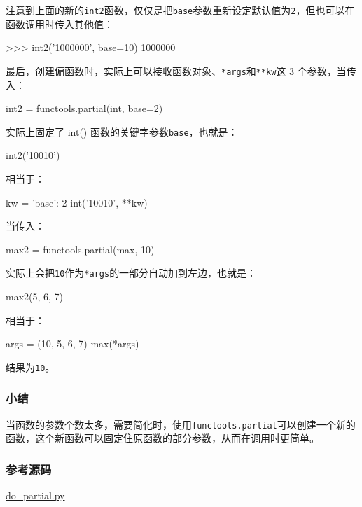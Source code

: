 注意到上面的新的\texttt{int2}函数，仅仅是把\texttt{base}参数重新设定默认值为\texttt{2}，但也可以在函数调用时传入其他值：

\begin{pythoncode}
>>> int2('1000000', base=10)
1000000
\end{pythoncode}

最后，创建偏函数时，实际上可以接收函数对象、\texttt{*args}和\texttt{**kw}这
3 个参数，当传入：

\begin{pythoncode}
int2 = functools.partial(int, base=2)
\end{pythoncode}

实际上固定了 int() 函数的关键字参数\texttt{base}，也就是：

\begin{pythoncode}
int2('10010')
\end{pythoncode}

相当于：

\begin{pythoncode}
kw = { 'base': 2 }
int('10010', **kw)
\end{pythoncode}

当传入：

\begin{pythoncode}
max2 = functools.partial(max, 10)
\end{pythoncode}

实际上会把\texttt{10}作为\texttt{*args}的一部分自动加到左边，也就是：

\begin{pythoncode}
max2(5, 6, 7)
\end{pythoncode}

相当于：

\begin{pythoncode}
args = (10, 5, 6, 7)
max(*args)
\end{pythoncode}

结果为\texttt{10}。

\hypertarget{ux5c0fux7ed3}{%
\subsubsection{小结}\label{ux5c0fux7ed3}}

当函数的参数个数太多，需要简化时，使用\texttt{functools.partial}可以创建一个新的函数，这个新函数可以固定住原函数的部分参数，从而在调用时更简单。

\hypertarget{ux53c2ux8003ux6e90ux7801}{%
\subsubsection{参考源码}\label{ux53c2ux8003ux6e90ux7801}}

\href{https://github.com/michaelliao/learn-python3/blob/master/samples/functional/do_partial.py}{do\_partial.py}

